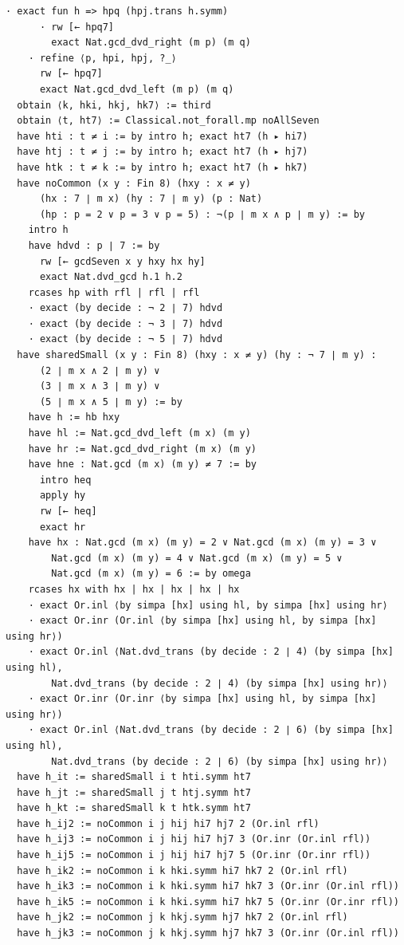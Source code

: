 \documentclass[11pt,a4paper]{article}
\begin{document}
\begin{Verbatim}[breaklines,breakanywhere,fontsize=\footnotesize]
      · exact fun h => hpq (hpj.trans h.symm)
      · rw [← hpq7]
        exact Nat.gcd_dvd_right (m p) (m q)
    · refine ⟨p, hpi, hpj, ?_⟩
      rw [← hpq7]
      exact Nat.gcd_dvd_left (m p) (m q)
  obtain ⟨k, hki, hkj, hk7⟩ := third
  obtain ⟨t, ht7⟩ := Classical.not_forall.mp noAllSeven
  have hti : t ≠ i := by intro h; exact ht7 (h ▸ hi7)
  have htj : t ≠ j := by intro h; exact ht7 (h ▸ hj7)
  have htk : t ≠ k := by intro h; exact ht7 (h ▸ hk7)
  have noCommon (x y : Fin 8) (hxy : x ≠ y)
      (hx : 7 ∣ m x) (hy : 7 ∣ m y) (p : Nat)
      (hp : p = 2 ∨ p = 3 ∨ p = 5) : ¬(p ∣ m x ∧ p ∣ m y) := by
    intro h
    have hdvd : p ∣ 7 := by
      rw [← gcdSeven x y hxy hx hy]
      exact Nat.dvd_gcd h.1 h.2
    rcases hp with rfl | rfl | rfl
    · exact (by decide : ¬ 2 ∣ 7) hdvd
    · exact (by decide : ¬ 3 ∣ 7) hdvd
    · exact (by decide : ¬ 5 ∣ 7) hdvd
  have sharedSmall (x y : Fin 8) (hxy : x ≠ y) (hy : ¬ 7 ∣ m y) :
      (2 ∣ m x ∧ 2 ∣ m y) ∨
      (3 ∣ m x ∧ 3 ∣ m y) ∨
      (5 ∣ m x ∧ 5 ∣ m y) := by
    have h := hb hxy
    have hl := Nat.gcd_dvd_left (m x) (m y)
    have hr := Nat.gcd_dvd_right (m x) (m y)
    have hne : Nat.gcd (m x) (m y) ≠ 7 := by
      intro heq
      apply hy
      rw [← heq]
      exact hr
    have hx : Nat.gcd (m x) (m y) = 2 ∨ Nat.gcd (m x) (m y) = 3 ∨
        Nat.gcd (m x) (m y) = 4 ∨ Nat.gcd (m x) (m y) = 5 ∨
        Nat.gcd (m x) (m y) = 6 := by omega
    rcases hx with hx | hx | hx | hx | hx
    · exact Or.inl ⟨by simpa [hx] using hl, by simpa [hx] using hr⟩
    · exact Or.inr (Or.inl ⟨by simpa [hx] using hl, by simpa [hx] using hr⟩)
    · exact Or.inl ⟨Nat.dvd_trans (by decide : 2 ∣ 4) (by simpa [hx] using hl),
        Nat.dvd_trans (by decide : 2 ∣ 4) (by simpa [hx] using hr)⟩
    · exact Or.inr (Or.inr ⟨by simpa [hx] using hl, by simpa [hx] using hr⟩)
    · exact Or.inl ⟨Nat.dvd_trans (by decide : 2 ∣ 6) (by simpa [hx] using hl),
        Nat.dvd_trans (by decide : 2 ∣ 6) (by simpa [hx] using hr)⟩
  have h_it := sharedSmall i t hti.symm ht7
  have h_jt := sharedSmall j t htj.symm ht7
  have h_kt := sharedSmall k t htk.symm ht7
  have h_ij2 := noCommon i j hij hi7 hj7 2 (Or.inl rfl)
  have h_ij3 := noCommon i j hij hi7 hj7 3 (Or.inr (Or.inl rfl))
  have h_ij5 := noCommon i j hij hi7 hj7 5 (Or.inr (Or.inr rfl))
  have h_ik2 := noCommon i k hki.symm hi7 hk7 2 (Or.inl rfl)
  have h_ik3 := noCommon i k hki.symm hi7 hk7 3 (Or.inr (Or.inl rfl))
  have h_ik5 := noCommon i k hki.symm hi7 hk7 5 (Or.inr (Or.inr rfl))
  have h_jk2 := noCommon j k hkj.symm hj7 hk7 2 (Or.inl rfl)
  have h_jk3 := noCommon j k hkj.symm hj7 hk7 3 (Or.inr (Or.inl rfl))

\end{Verbatim}
\end{document}
